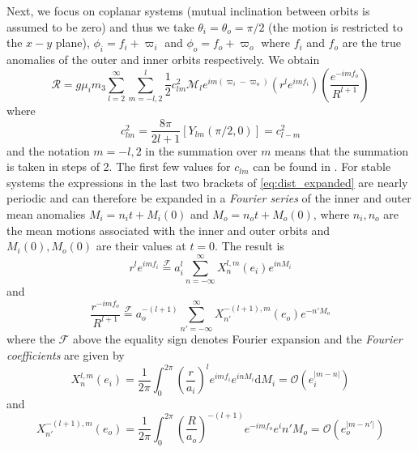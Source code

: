 Next, we focus on coplanar systems
(mutual inclination between orbits is assumed to be zero) and thus we take
$\theta_i=\theta_o=\pi/2$ (the motion is restricted to the $x-y$ plane), 
$\phi_i=f_i+\varpi_i$ and $\phi_o=f_o+\varpi_o$ where $f_i$ and $f_o$ are
the true anomalies of the outer and inner orbits respectively. We obtain 
\begin{equation}
    \mathcal{R}=g\mu_im_3\sum^\infty_{l=2}\sum^l_{m=-l,2} \frac{1}{2} c_{lm}^2\mathcal{M}_l
    e^{im(\varpi_i-\varpi_o)}\left(r^le^{imf_i}\right)\left( \frac{e^{-imf_o}}{R^{l+1}} 
    \right)
    \label{eq:dist_expanded}
\end{equation}
where
\begin{equation}
    c^2_{lm}= \frac{8\pi}{2l+1} \left[Y_{lm}(\pi/2,0)\right]=c^2_{l-m}
\end{equation}
and the notation $m=-l, 2$ in the summation over $m$ means that the summation is taken
in steps of 2. The first few values for $c_{lm}$ can be found in \cite{Mardling2013}.
For stable systems the expressions in the last two brackets of
\cref{eq:dist_expanded} are nearly periodic and can therefore be expanded in a 
\emph{Fourier series} of the inner and outer mean anomalies $M_i=n_it+M_i(0)$ and
$M_o=n_ot+M_o(0)$, where $n_i,n_o$ are the mean motions associated with the inner
and outer orbits and $M_i(0),M_o(0)$ are their values at $t=0$.  The result is
\begin{equation}
    r^le^{imf_i}\stackrel{\mathcal{F}}{=}a_i^l\sum^\infty_{n=-\infty}X^{l,m}_n(e_i)e^{inM_i}
    \label{eq:expansion_1}
\end{equation}
and
\begin{equation}
    \frac{r^{-imf_o}}{R^{l+1}} \stackrel{\mathcal{F}}{=}a_o^{-(l+1)}\sum^\infty_{n'=-\infty}
    X^{-(l+1),m}_{n'}(e_o)e^{-n'M_o}
    \label{eq:expansion_2}
\end{equation}
where the $\mathcal{F}$ above the equality sign denotes Fourier expansion 
and the \emph{Fourier coefficients} are given by
\begin{equation}
    X^{l,m}_n(e_i)= \frac{1}{2\pi} \int^{2\pi}_0 \left(\frac{r}{a_i}\right)^l
    e^{imf_i}e^{inM_i}\mathrm{d}M_i=\mathcal{O}(e_i^{\lvert m-n\rvert})
    \label{eq:hansen_inner}
\end{equation}
and
\begin{equation}
    X^{-(l+1),m}_{n'}(e_o)= \frac{1}{2\pi} \int^{2\pi}_0 \left( \frac{R}{a_o}
    \right)^{-(l+1)}e^{-imf_o}e^in'M_o=\mathcal{O}(e_o^{\lvert m-n'\rvert})
    \label{eq:hansen_outer}
\end{equation}
